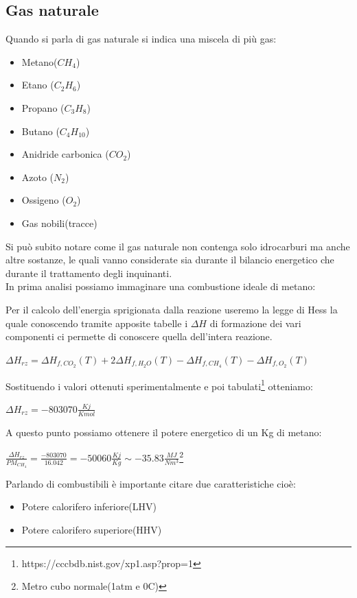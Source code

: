 \subsection{Gas naturale}
Quando si parla di gas naturale si indica una miscela di più gas:
\begin{itemize}
    \item Metano($C H_4$)
    \item Etano ($C_2 H_6$)
    \item Propano ($C_3 H_8$)
    \item Butano ($C_4 H_10$)
    \item Anidride carbonica ($C O_2$)
    \item Azoto ($N_2$)
    \item Ossigeno ($O_2$)
    \item Gas nobili(tracce)
\end{itemize}
Si può subito notare come il gas naturale non contenga solo idrocarburi ma anche altre sostanze, le quali vanno considerate sia durante il bilancio energetico che durante il trattamento degli inquinanti.\\
In prima analisi possiamo immaginare una combustione ideale di metano:
\begin{center}
\end{center}
Per il calcolo dell'energia sprigionata dalla reazione useremo la legge di Hess la quale conoscendo tramite apposite tabelle i $\Delta H$ di formazione dei vari componenti ci permette di conoscere quella dell'intera reazione.
\begin{center}
    \large{$\Delta H_{rz} = \Delta H_{f,CO_2}(T) + 2\Delta H_{f,H_2O}(T) - \Delta H_{f,CH_4}(T) - \Delta H_{f,O_2}(T) $}
\end{center}
Sostituendo i valori ottenuti sperimentalmente e poi tabulati\footnote{https://cccbdb.nist.gov/xp1.asp?prop=1} otteniamo:
\begin{center}
    \large{$\Delta H_{rz} = -803070\frac{Kj}{Kmol} $}
\end{center}
A questo punto possiamo ottenere il potere energetico di un Kg di metano:
\begin{center}
    {\large$\frac{\Delta H_{rz}}{PM_{CH_4}} = \frac{-803070}{16.042} = -50060 \frac{Kj}{Kg} \sim -35.83 \frac{MJ}{Nm^3}$\footnote{Metro cubo normale(1atm e 0\degree C)}}
\end{center}
\newpage\noindent
Parlando di combustibili è importante citare due caratteristiche cioè:
\begin{itemize}
    \item Potere calorifero inferiore(LHV)
    \item Potere calorifero superiore(HHV)
\end{itemize}
